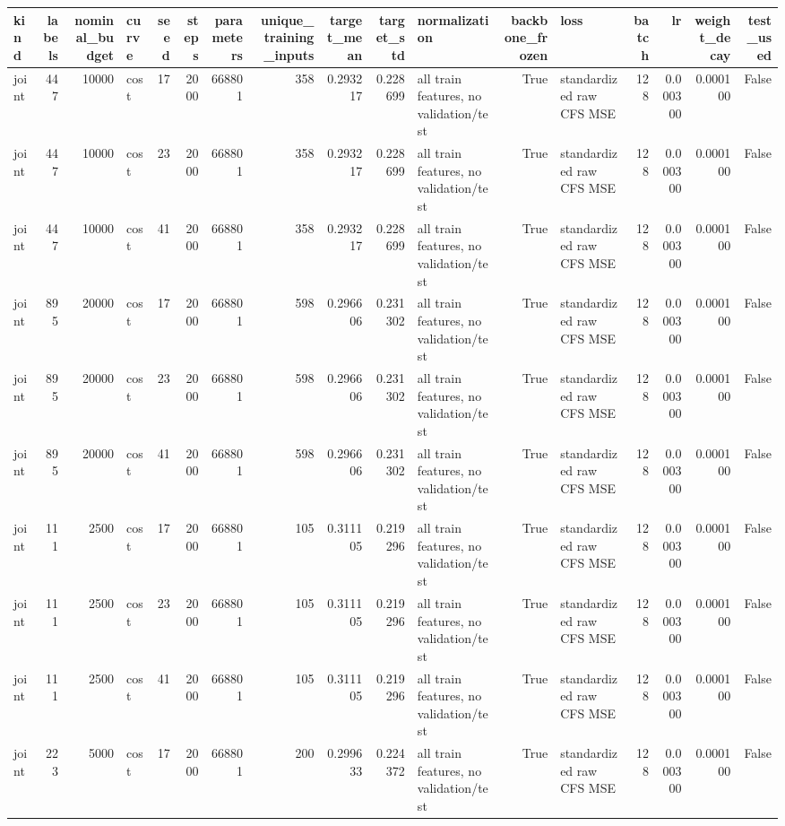 \begin{tabular}{lrrlrrrrrrlrlrrrr}
\toprule
kind & labels & nominal_budget & curve & seed & steps & parameters & unique_training_inputs & target_mean & target_std & normalization & backbone_frozen & loss & batch & lr & weight_decay & test_used \\
\midrule
joint & 447 & 10000 & cost & 17 & 2000 & 668801 & 358 & 0.293217 & 0.228699 & all train features, no validation/test & True & standardized raw CFS MSE & 128 & 0.000300 & 0.000100 & False \\
joint & 447 & 10000 & cost & 23 & 2000 & 668801 & 358 & 0.293217 & 0.228699 & all train features, no validation/test & True & standardized raw CFS MSE & 128 & 0.000300 & 0.000100 & False \\
joint & 447 & 10000 & cost & 41 & 2000 & 668801 & 358 & 0.293217 & 0.228699 & all train features, no validation/test & True & standardized raw CFS MSE & 128 & 0.000300 & 0.000100 & False \\
joint & 895 & 20000 & cost & 17 & 2000 & 668801 & 598 & 0.296606 & 0.231302 & all train features, no validation/test & True & standardized raw CFS MSE & 128 & 0.000300 & 0.000100 & False \\
joint & 895 & 20000 & cost & 23 & 2000 & 668801 & 598 & 0.296606 & 0.231302 & all train features, no validation/test & True & standardized raw CFS MSE & 128 & 0.000300 & 0.000100 & False \\
joint & 895 & 20000 & cost & 41 & 2000 & 668801 & 598 & 0.296606 & 0.231302 & all train features, no validation/test & True & standardized raw CFS MSE & 128 & 0.000300 & 0.000100 & False \\
joint & 111 & 2500 & cost & 17 & 2000 & 668801 & 105 & 0.311105 & 0.219296 & all train features, no validation/test & True & standardized raw CFS MSE & 128 & 0.000300 & 0.000100 & False \\
joint & 111 & 2500 & cost & 23 & 2000 & 668801 & 105 & 0.311105 & 0.219296 & all train features, no validation/test & True & standardized raw CFS MSE & 128 & 0.000300 & 0.000100 & False \\
joint & 111 & 2500 & cost & 41 & 2000 & 668801 & 105 & 0.311105 & 0.219296 & all train features, no validation/test & True & standardized raw CFS MSE & 128 & 0.000300 & 0.000100 & False \\
joint & 223 & 5000 & cost & 17 & 2000 & 668801 & 200 & 0.299633 & 0.224372 & all train features, no validation/test & True & standardized raw CFS MSE & 128 & 0.000300 & 0.000100 & False \\

\end{tabular}
